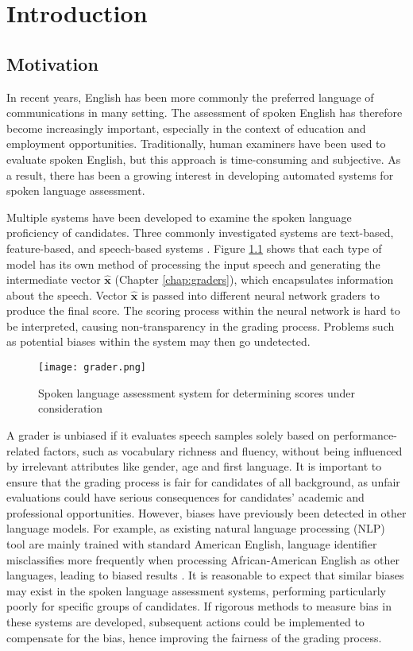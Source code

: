 \chapter{Introduction}

\section{Motivation}
In recent years, English has been more commonly the preferred language of communications in many setting. The assessment of spoken English has therefore become increasingly important, especially in the context of education and employment opportunities. Traditionally, human examiners have been used to evaluate spoken English, but this approach is time-consuming and subjective. As a result, there has been a growing interest in developing automated systems for spoken language assessment.

Multiple systems have been developed to examine the spoken language proficiency of candidates. Three commonly investigated systems are text-based, feature-based, and speech-based systems \cite{graders}. Figure \ref{fig:grader} shows that each type of model has its own method of processing the input speech and generating the intermediate vector $\mathbf{\hat{x}}$ (Chapter \ref{chap:graders}), which encapsulates information about the speech. Vector $\mathbf{\hat{x}}$ is passed into different neural network graders to produce the final score. The scoring process within the neural network is hard to be interpreted, causing non-transparency in the grading process. Problems such as potential biases within the system may then go undetected.

\begin{figure}[H]
    \centering
    \texttt{[image: grader.png]}
    \caption{Spoken language assessment system for determining scores under consideration}
    \label{fig:grader}
\end{figure}

A grader is unbiased if it evaluates speech samples solely based on performance-related factors, such as vocabulary richness and fluency, without being influenced by irrelevant attributes like gender, age and first language. It is important to ensure that the grading process is fair for candidates of all background, as unfair evaluations could have serious consequences for candidates' academic and professional opportunities. However, biases have previously been detected in other language models. For example, as existing natural language processing (NLP) tool are mainly trained with standard American English, language identifier misclassifies more frequently when processing African-American English as other languages, leading to biased results \cite{bias}. It is reasonable to expect that similar biases may exist in the spoken language assessment systems, performing particularly poorly for specific groups of candidates. If rigorous methods to measure bias in these systems are developed, subsequent actions could be implemented to compensate for the bias, hence improving the fairness of the grading process.

